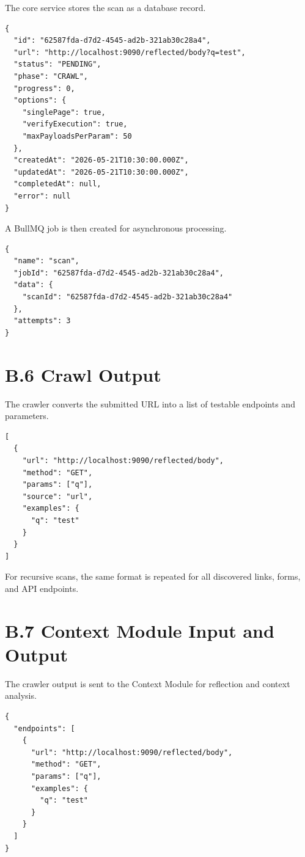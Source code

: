 The core service stores the scan as a database record.

\begin{lstlisting}[style=appendixcode,caption={Simplified scan database record}]
{
  "id": "62587fda-d7d2-4545-ad2b-321ab30c28a4",
  "url": "http://localhost:9090/reflected/body?q=test",
  "status": "PENDING",
  "phase": "CRAWL",
  "progress": 0,
  "options": {
    "singlePage": true,
    "verifyExecution": true,
    "maxPayloadsPerParam": 50
  },
  "createdAt": "2026-05-21T10:30:00.000Z",
  "updatedAt": "2026-05-21T10:30:00.000Z",
  "completedAt": null,
  "error": null
}
\end{lstlisting}

A BullMQ job is then created for asynchronous processing.

\begin{lstlisting}[style=appendixcode,caption={BullMQ scan job payload}]
{
  "name": "scan",
  "jobId": "62587fda-d7d2-4545-ad2b-321ab30c28a4",
  "data": {
    "scanId": "62587fda-d7d2-4545-ad2b-321ab30c28a4"
  },
  "attempts": 3
}
\end{lstlisting}

\section*{B.6 Crawl Output}

The crawler converts the submitted URL into a list of testable endpoints and parameters.

\begin{lstlisting}[style=appendixcode,caption={Crawler output for single-page scan}]
[
  {
    "url": "http://localhost:9090/reflected/body",
    "method": "GET",
    "params": ["q"],
    "source": "url",
    "examples": {
      "q": "test"
    }
  }
]
\end{lstlisting}

For recursive scans, the same format is repeated for all discovered links, forms, and API endpoints.

\section*{B.7 Context Module Input and Output}

The crawler output is sent to the Context Module for reflection and context analysis.

\begin{lstlisting}[style=appendixcode,caption={Context Module input}]
{
  "endpoints": [
    {
      "url": "http://localhost:9090/reflected/body",
      "method": "GET",
      "params": ["q"],
      "examples": {
        "q": "test"
      }
    }
  ]
}
\end{lstlisting}

